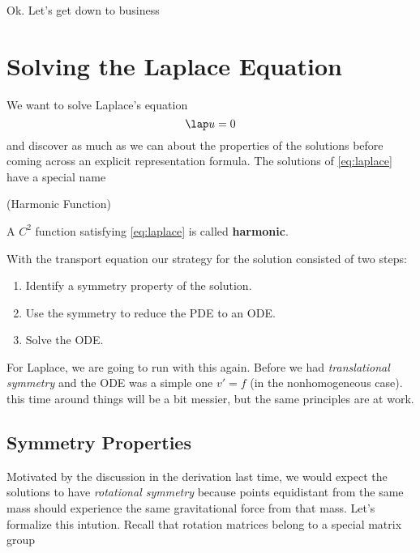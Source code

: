 \documentclass{bkcnotes}
\begin{document}
\maketitle

Ok. Let's get down to business

\section{Solving the Laplace Equation}
We want to solve Laplace's equation
\begin{equation}
  \label{eq:laplace}
  \lap u = 0
\end{equation}
and discover as much as we can about the properties of the solutions
before coming across an explicit representation formula. The solutions
of \eqref{eq:laplace} have a special name

\begin{ndefn}(Harmonic Function)
  
  A $C^2$ function satisfying \eqref{eq:laplace} is called
  \textbf{harmonic}.
\end{ndefn}

With the transport equation our strategy for the solution consisted of
two steps:
\begin{enumerate}
\item Identify a symmetry property of the solution.
\item Use the symmetry to reduce the PDE to an ODE.
\item Solve the ODE.
\end{enumerate}
For Laplace, we are going to run with this again. Before we had
\emph{translational symmetry} and the ODE was a simple one $v' = f$
(in the nonhomogeneous case). this time around things will be a bit
messier, but the same principles are at work.

\subsection{Symmetry Properties}
Motivated by the discussion in the derivation last time, we would
expect the solutions to have \emph{rotational symmetry} because points
equidistant from the same mass should experience the same
gravitational force from that mass. Let's formalize this
intution. Recall that rotation matrices belong to a special matrix
group
\end{document}
